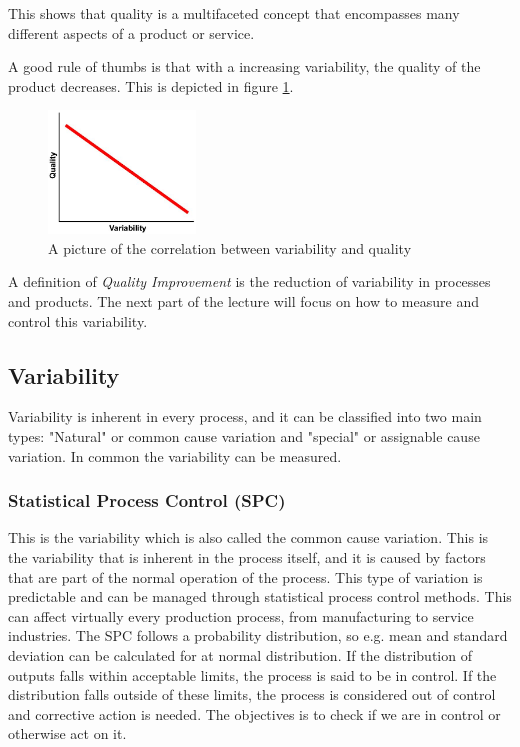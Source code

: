 This shows that quality is a multifaceted concept that encompasses many different aspects of a product or service.

A good rule of thumbs is that with a increasing variability, the quality of the product decreases. This is depicted in figure \ref{fig:qualVSvar}.
\begin{figure}[h]
    \centering
    \includegraphics[width=0.35\textwidth]{Figures/qualVSvar.JPG}
    \caption{A picture of the correlation between variability and quality}
    \label{fig:qualVSvar}
\end{figure}

\vspace{2\baselineskip}

A definition of \textit{Quality Improvement} is the reduction of variability in processes and products. The next part of the lecture will focus on how to measure and control this variability.

\subsection{Variability}    
Variability is inherent in every process, and it can be classified into two main types: "Natural" or common cause variation and "special" or assignable cause variation. In common the variability can be measured. 
\subsubsection{Statistical Process Control (SPC)}
This is the variability which is also called the common cause variation. This is the variability that is inherent in the process itself, and it is caused by factors that are part of the normal operation of the process. This type of variation is predictable and can be managed through statistical process control methods. This can affect virtually every production process, from manufacturing to service industries. The SPC follows a probability distribution, so e.g. mean and standard deviation can be calculated for at normal distribution. If the distribution of outputs falls within acceptable limits, the process is said to be in control. If the distribution falls outside of these limits, the process is considered out of control and corrective action is needed. The objectives is to check if we are in control or otherwise act on it.

